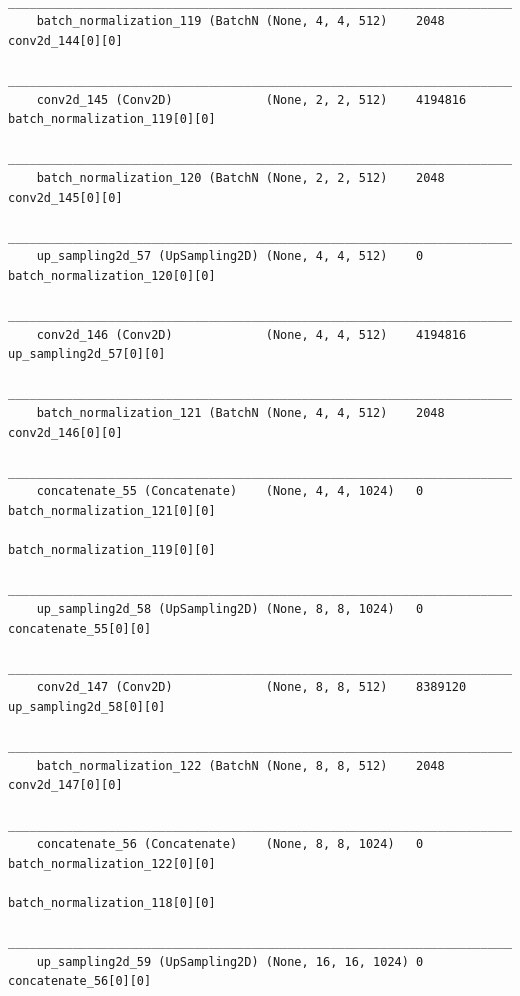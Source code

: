 {\begin{verbatim}
    __________________________________________________________________________________________________
    batch_normalization_119 (BatchN (None, 4, 4, 512)    2048        conv2d_144[0][0]                 
    __________________________________________________________________________________________________
    conv2d_145 (Conv2D)             (None, 2, 2, 512)    4194816     batch_normalization_119[0][0]    
    __________________________________________________________________________________________________
    batch_normalization_120 (BatchN (None, 2, 2, 512)    2048        conv2d_145[0][0]                 
    __________________________________________________________________________________________________
    up_sampling2d_57 (UpSampling2D) (None, 4, 4, 512)    0           batch_normalization_120[0][0]    
    __________________________________________________________________________________________________
    conv2d_146 (Conv2D)             (None, 4, 4, 512)    4194816     up_sampling2d_57[0][0]           
    __________________________________________________________________________________________________
    batch_normalization_121 (BatchN (None, 4, 4, 512)    2048        conv2d_146[0][0]                 
    __________________________________________________________________________________________________
    concatenate_55 (Concatenate)    (None, 4, 4, 1024)   0           batch_normalization_121[0][0]    
                                                                        batch_normalization_119[0][0]    
    __________________________________________________________________________________________________
    up_sampling2d_58 (UpSampling2D) (None, 8, 8, 1024)   0           concatenate_55[0][0]             
    __________________________________________________________________________________________________
    conv2d_147 (Conv2D)             (None, 8, 8, 512)    8389120     up_sampling2d_58[0][0]           
    __________________________________________________________________________________________________
    batch_normalization_122 (BatchN (None, 8, 8, 512)    2048        conv2d_147[0][0]                 
    __________________________________________________________________________________________________
    concatenate_56 (Concatenate)    (None, 8, 8, 1024)   0           batch_normalization_122[0][0]    
                                                                        batch_normalization_118[0][0]    
    __________________________________________________________________________________________________
    up_sampling2d_59 (UpSampling2D) (None, 16, 16, 1024) 0           concatenate_56[0][0]             

\end{verbatim}}
